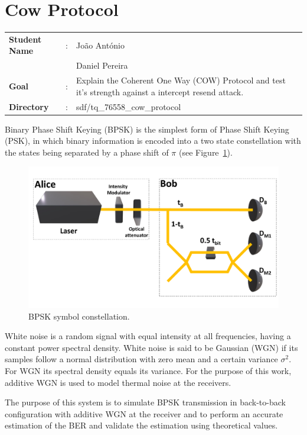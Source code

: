 \clearpage
\section{Cow Protocol}

\begin{refsection}

\begin{tcolorbox}	
\begin{tabular}{p{2.75cm} p{0.2cm} p{10.5cm}} 	
\textbf{Student Name}  &:&  Jo\~ao Ant\'onio\\
\textbf{}  & &  Daniel Pereira\\
\textbf{Goal}          &:& Explain the Coherent One Way (COW) Protocol and test it's strength against a intercept resend attack.\\
\textbf{Directory}              &:& sdf/tq_76558_cow_protocol
\end{tabular}
\end{tcolorbox}

Binary Phase Shift Keying (BPSK) is the simplest form of Phase Shift Keying (PSK), in which binary information is encoded into a two state constellation with the states being separated by a phase shift of $\pi$ (see Figure~\ref{fig:BPSKConst}).

\begin{figure}[h]
\centering
\includegraphics[width=.4\linewidth]{./sdf/tq_76558_cow_protocol/slides/figures/Full2.pdf}
\caption{BPSK symbol constellation.}
\label{fig:BPSKConst}
\end{figure}

\par
White noise is a random signal with equal intensity at all frequencies, having a constant power spectral density. White noise is said to be Gaussian (WGN) if its samples follow a normal distribution with zero mean and a certain variance $\sigma^2$. For WGN its spectral density equals its variance. For the purpose of this work, additive WGN is used to model thermal noise at the receivers.
\par
The purpose of this system is to simulate BPSK transmission in back-to-back configuration with additive WGN at the receiver and to perform an accurate estimation of the BER and validate the estimation using theoretical values.


\end{refsection}
